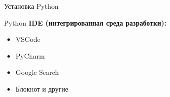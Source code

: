 \documentclass[12pt]{beamer}
\begin{document}
\begin{frame}{Установка Python}
\end{frame}

\begin{frame}{Python}
\textbf{IDE (интегрированная среда разработки):}
\vspace{0.5cm}
\begin{itemize}
\item VSCode \href{https://code.visualstudio.com/}{}
\item PyCharm  \href{https://www.jetbrains.com/pycharm/}{}
\item Google Search
\item Блокнот и другие
\end{itemize}
\end{frame}
\end{document}
